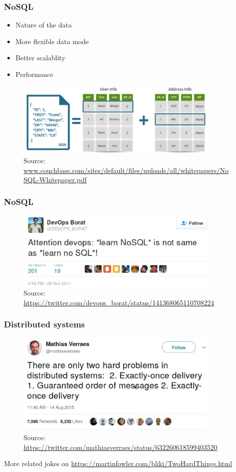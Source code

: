 \documentclass[10pt,utf8]{beamer}
\begin{document}
\begin{frame}
	\frametitle{NoSQL}
	\begin{itemize}
		\item Nature of the data
		\pause
		\item More flexible data mode
		\pause
		\item Better scalablity
		\pause
		\item Performance
	\end{itemize}
	\begin{figure}
		\centering
		\includegraphics[width=10cm]{./img/json_vs_sql.eps}
		\caption{\tiny{Source: \url{www.couchbase.com/sites/default/files/uploads/all/whitepapers/NoSQL-Whitepaper.pdf}}}
	\end{figure}
\end{frame}

\begin{frame}
	\frametitle{NoSQL}
		\begin{figure}
			\centering
			\includegraphics[width=10cm]{./img/borat_learn_nosql.eps}
			\caption{\tiny{Source: \url{https://twitter.com/devops_borat/status/141368065110708224}}}
		\end{figure}
\end{frame}

\begin{frame}
	\frametitle{Distributed systems}
	\begin{figure}
		\centering
		\includegraphics[width=10cm]{./img/two_hard_things.eps}
		\caption{\tiny{Source: \url{https://twitter.com/mathiasverraes/status/632260618599403520}}}
	\end{figure}
	More related jokes on \color{blue}\url{https://martinfowler.com/bliki/TwoHardThings.html}\color{black}
\end{frame}
\end{document}
